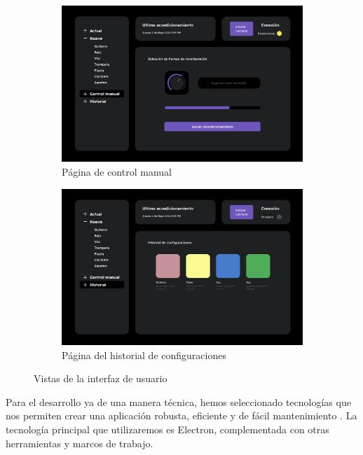 \begin{figure}[!htb]
\begin{subfigure}{0.45\textwidth}
        \includegraphics[width=\linewidth]{imagenes/Control Manual.png}
        \caption{\footnotesize Página de control manual}
        \label{fig:pagina_manual}
    \end{subfigure}
    \hfill
    \begin{subfigure}{0.45\textwidth}
        \centering
        \includegraphics[width=\linewidth]{imagenes/Historial.png}
        \caption{\footnotesize Página del historial de configuraciones}
        \label{fig:pagina_historial}
    \end{subfigure}
    \caption{Vistas de la interfaz de usuario}
    \label{fig:vistas_interfaz}
\end{figure}
\FloatBarrier

Para el desarrollo ya de una manera técnica, hemos seleccionado tecnologías que nos permiten crear una aplicación robusta, eficiente y de fácil mantenimiento \cite{WeavingWeb}. La tecnología principal que utilizaremos es Electron, complementada con otras herramientas y marcos de trabajo. \\

